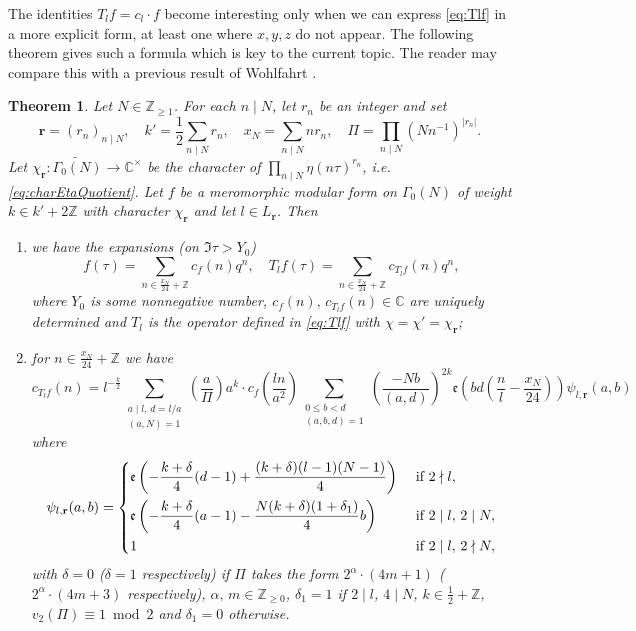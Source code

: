 \documentclass[12pt]{amsart}
\numberwithin{equation}{section}
\theoremstyle{plain}
\newtheorem{thm}{Theorem}[section]
\theoremstyle{definition}
\theoremstyle{remark}
\newcommand\twoscript[2]{\substack{{#1} \\ {#2}}}
\newcommand\legendre[2]{\genfrac{(}{)}{}{}{#1}{#2}}
\newcommand*\abs[1]{\lvert#1\rvert}
\newcommand\etp[1]{\mathfrak{e}\left(#1\right)}
\newcommand\numZ{\mathbb{Z}}
\newcommand\numC{\mathbb{C}}
\newcommand\numgeq[2]{\mathbb{#1}_{\geq #2}}
\begin{document}
The identities $T_lf=c_l\cdot f$ become interesting only when we can express \eqref{eq:Tlf} in a more explicit form, at least one where $x,y,z$ do not appear. The following theorem gives such a formula which is key to the current topic. The reader may compare this with a previous result of Wohlfahrt \cite[Eq. (7$\vert$3) and (10$\vert$3)]{Woh57}.
\begin{thm}
\label{thm:cTlfbycf}
Let $N\in\numgeq{Z}{1}$. For each $n\mid N$, let $r_n$ be an integer and set 
\begin{equation}
\label{eq:notationsrn}
\mathbf{r}=(r_n)_{n\mid N},\quad k'=\frac{1}{2}\sum_{n\mid N}r_n,\quad x_N=\sum_{n\mid N}nr_n,\quad \varPi=\prod_{n\mid N}(Nn^{-1})^{\abs{r_n}}.
\end{equation}
Let $\chi_\mathbf{r}\colon\widetilde{\Gamma_0(N)}\rightarrow\numC^\times$ be the character of $\prod_{n\mid N}\eta(n\tau)^{r_n}$, i.e. \eqref{eq:charEtaQuotient}. Let $f$ be a meromorphic modular form on $\Gamma_0(N)$ of weight $k\in k'+2\numZ$ with character $\chi_{\mathbf{r}}$ and let $l\in L_\mathbf{r}$. Then
\begin{enumerate}
  \item we have the expansions (on $\Im\tau>Y_0$)
  \begin{equation*}
  f(\tau)=\sum_{n\in\frac{x_N}{24}+\numZ}c_f(n)q^n,\quad T_lf(\tau)=\sum_{n\in\frac{x_N}{24}+\numZ}c_{T_lf}(n)q^n,
  \end{equation*}
  where $Y_0$ is some nonnegative number, $c_f(n),\,c_{T_lf}(n)\in\numC$ are uniquely determined and $T_l$ is the operator defined in \eqref{eq:Tlf} with $\chi=\chi'=\chi_\mathbf{r}$;
  \item for $n\in\frac{x_N}{24}+\numZ$ we have
  \begin{equation}
  \label{eq:cTlfbycf}
  c_{T_lf}(n)=l^{-\frac{k}{2}}\sum_{\twoscript{a\mid l,\,d=l/a}{(a,N)=1}}\legendre{a}{\varPi}a^k\cdot c_f\left(\frac{ln}{a^2}\right)\sum_{\twoscript{0\leq b<d}{(a,b,d)=1}}\legendre{-Nb}{(a,d)}^{2k}\etp{bd\left(\frac{n}{l}-\frac{x_N}{24}\right)}\psi_{l,\mathbf{r}}(a,b)
  \end{equation}
  where
  \begin{equation*}
  \psi_{l,\mathbf{r}}(a,b)=\begin{dcases}
  \etp{-\frac{k+\delta}{4}(d-1)+\frac{(k+\delta)(l-1)(N-1)}{4}} &\text{ if } 2\nmid l,\\
  \etp{-\frac{k+\delta}{4}(a-1)-\frac{N(k+\delta)(1+\delta_1)}{4}b} &\text{ if } 2\mid l,\,2\mid N,\\
  1 &\text{ if } 2\mid l,\,2\nmid N,
  \end{dcases}
  \end{equation*}
  with $\delta=0$ ($\delta=1$ respectively) if $\varPi$ takes the form $2^\alpha\cdot(4m+1)$ ($2^\alpha\cdot(4m+3)$ respectively), $\alpha,\,m\in\numgeq{Z}{0}$, $\delta_1=1$ if $2\mid l$, $4\mid N$, $k\in\frac{1}{2}+\numZ$, $v_2(\varPi)\equiv1\bmod{2}$ and $\delta_1=0$ otherwise.
\end{enumerate}
\end{thm}
\end{document}
